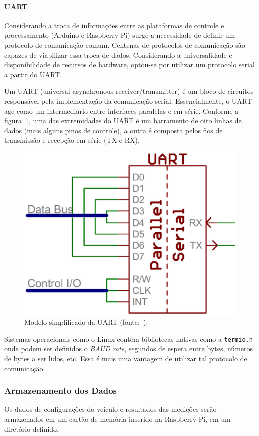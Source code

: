   \paragraph{UART}
	Considerando a troca de informações entre as plataformas de controle e
	processamento (Arduino e Raspberry Pi) surge a necessidade de definir
	um protocolo de comunicação comum. Centenas de protocolos de comunicação
	são capazes de viabilizar essa troca de dados. Considerando a universalidade
	e disponibilidade de recursos de hardware, optou-se por utilizar um
	protocolo serial a partir do UART.

	Um UART (universal asynchronous receiver/transmitter) é um bloco de circuitos
	responsável pela implementação da comunicação serial. Essencialmente, o UART
	age como um intermediário entre interfaces paralelas e em série. Conforme a
	figura~\ref{fig:uart}, uma das extremidades do UART é um barramento de oito linhas de
	dados (mais alguns pinos de controle), a outra é composta pelos fios de
	transmissão e recepção em série (TX e RX).

	\begin{figure}[!htbp]
	\begin{center}
	\includegraphics[width=.6\textwidth]{figuras/uart.eps}
	\caption{\label{fig:uart}Modelo simplificado da UART (fonte:~).}
	\end{center}
	\end{figure}

	Sistemas operacionais como o Linux contém bibliotecas nativas como a
	\texttt{termio.h} onde podem ser definidos o \textit{BAUD rate},
	segundos de espera entre bytes, números de bytes a ser lidos, etc.
	Essa é mais uma vantagem de utilizar tal protocolo de comunicação.

  \subsubsection{Armazenamento dos Dados}
  Os dados de configurações do veículo e resultados das medições serão armazenados
  em um cartão de memória inserido na Raspberry Pi, em um diretório definido.


